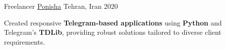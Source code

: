 \begin{cventries}
  \cventry
    {Freelancer} %
    {\href{https://ponisha.ir/profile/radinshayanfar}{Ponisha}} %
    {Tehran, Iran} %
    {2020} %
    {
      \begin{cvitems} %
        \item{Created responsive \textbf{Telegram-based applications} using \textbf{Python} and Telegram’s \textbf{TDLib}, providing robust solutions tailored to diverse client requirements.}
      \end{cvitems}
    }

\end{cventries}


